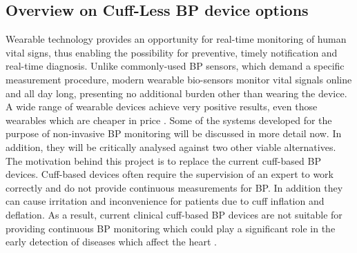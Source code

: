 \subsection*{Overview on Cuff-Less BP device options} 
Wearable technology provides an opportunity for real-time monitoring of human vital signs, thus enabling the
 possibility for preventive, timely notification and real-time diagnosis. Unlike commonly-used BP sensors,
  which demand a specific measurement procedure, modern wearable bio-sensors monitor vital signals online and all
   day long, presenting no additional burden other than wearing the device.  A wide range of wearable 
   devices achieve very positive results, even those wearables which are cheaper in price \cite{Simjanoska20182}. Some
    of the systems developed for the purpose of non-invasive BP monitoring will be discussed in more detail now. 
    In addition, they will be critically analysed against two other viable alternatives. \\ \newline \noindent The 
    motivation behind this project is to replace the current cuff-based BP devices. Cuff-based devices often
     require the supervision of an expert to work correctly and do not provide continuous measurements for BP. 
     In addition they can cause irritation and inconvenience for patients due to cuff inflation and deflation. 
     As a result, current clinical cuff-based BP devices are not suitable for providing continuous BP monitoring 
     which could play a significant role in the early detection of diseases which affect the heart \cite{ElHajj2020}.

